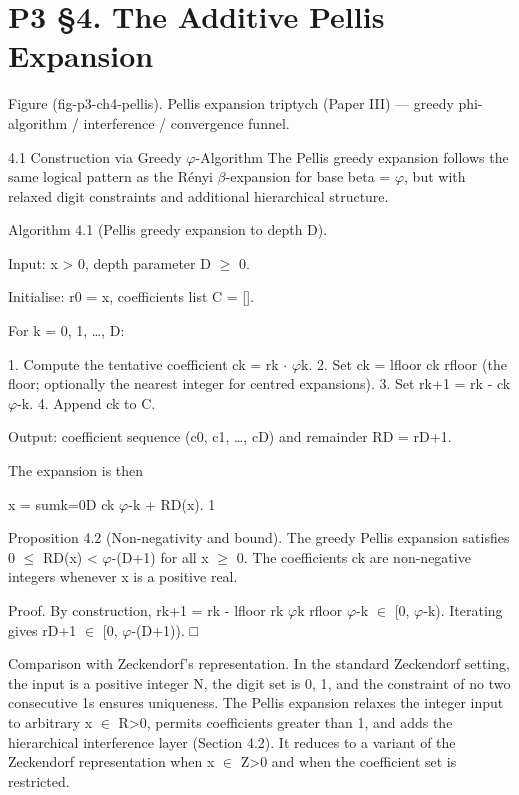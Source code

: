 
\section{P3 §4. The Additive Pellis Expansion}

Figure (fig-p3-ch4-pellis). Pellis expansion triptych (Paper III) --- greedy phi-algorithm /
                                         interference / convergence funnel.

  4.1 Construction via Greedy $\varphi$-Algorithm
  The Pellis greedy expansion follows the same logical pattern as the Rényi $\beta$-expansion
  for base beta = $\varphi$, but with relaxed digit constraints and additional hierarchical
  structure.

  Algorithm 4.1 (Pellis greedy expansion to depth D).

  Input: x > 0, depth parameter D $\geq$ 0.

  Initialise: r0 = x, coefficients list C = [].

  For k = 0, 1, …, D:

  1. Compute the tentative coefficient ck = rk $\cdot$ $\varphi$k.
  2. Set ck = lfloor ck rfloor (the floor; optionally the nearest integer for centred
  expansions).
  3. Set rk+1 = rk - ck $\varphi$-k.
  4. Append ck to C.

  Output: coefficient sequence (c0, c1, …, cD) and remainder RD = rD+1.

  The expansion is then

  x = sumk=0D ck $\varphi$-k + RD(x). 1

        Proposition 4.2 (Non-negativity and bound). The greedy Pellis expansion
        satisfies 0 $\leq$ RD(x) < $\varphi$-(D+1) for all x $\geq$ 0. The coefficients ck are non-negative
        integers whenever x is a positive real.

        Proof. By construction, rk+1 = rk - lfloor rk $\varphi$k rfloor $\varphi$-k $\in$ [0, $\varphi$-k). Iterating
        gives rD+1 $\in$ [0, $\varphi$-(D+1)). □

  Comparison with Zeckendorf's representation. In the standard Zeckendorf setting, the
  input is a positive integer N, the digit set is {0, 1}, and the constraint of no two
  consecutive 1s ensures uniqueness. The Pellis expansion relaxes the integer input to
  arbitrary x $\in$ R>0, permits coefficients greater than 1, and adds the hierarchical
  interference layer (Section 4.2). It reduces to a variant of the Zeckendorf
  representation when x $\in$ Z>0 and when the coefficient set is restricted.

